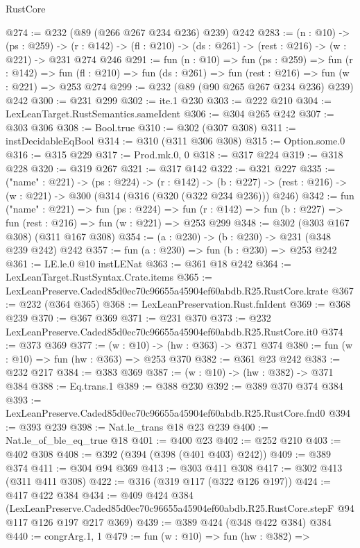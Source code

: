 \begin{lexlean}{RustCore}
\begin{coremodule}
@274 := @232 (@89 (@266 @267 @234 @236) @239) @242
@283 := (n : @10) ->
  (ps : @259) ->
  (r : @142) -> (fl : @210) -> (ds : @261) -> (rest : @216) -> (w : @221) -> @231 @274 @246
@291 := fun (n : @10) =>
  fun (ps : @259) =>
  fun (r : @142) =>
  fun (fl : @210) => fun (ds : @261) => fun (rest : @216) => fun (w : @221) => @253 @274
@299 := @232 (@89 (@90 @265 @267 @234 @236) @239) @242
@300 := @231 @299
@302 := ite.{1} @230
@303 := @222 @210
@304 := LexLeanTarget.RustSemantics.sameIdent
@306 := @304 @265 @242
@307 := @303 @306
@308 := Bool.true
@310 := @302 (@307 @308)
@311 := instDecidableEqBool
@314 := @310 (@311 @306 @308)
@315 := Option.some.{0}
@316 := @315 @229
@317 := Prod.mk.{0, 0}
@318 := @317 @224
@319 := @318 @228
@320 := @319 @267
@321 := @317 @142
@322 := @321 @227
@335 := ("name" : @221) ->
  (ps : @224) ->
  (r : @142) ->
  (b : @227) -> (rest : @216) -> (w : @221) -> @300 (@314 (@316 (@320 (@322 @234 @236))) @246)
@342 := fun ("name" : @221) =>
  fun (ps : @224) =>
  fun (r : @142) => fun (b : @227) => fun (rest : @216) => fun (w : @221) => @253 @299
@348 := @302 (@303 @167 @308) (@311 @167 @308)
@354 := (a : @230) -> (b : @230) -> @231 (@348 @239 @242) @242
@357 := fun (a : @230) => fun (b : @230) => @253 @242
@361 := LE.le.{0} @10 instLENat
@363 := @361 @18 @242
@364 := LexLeanTarget.RustSyntax.Crate.items
@365 := LexLeanPreserve.Caded85d0ec70c96655a45904ef60abdb.R25.RustCore.krate
@367 := @232 (@364 @365)
@368 := LexLeanPreservation.Rust.fnIdent
@369 := @368 @239
@370 := @367 @369
@371 := @231 @370
@373 := @232 LexLeanPreserve.Caded85d0ec70c96655a45904ef60abdb.R25.RustCore.it0
@374 := @373 @369
@377 := (w : @10) -> (hw : @363) -> @371 @374
@380 := fun (w : @10) => fun (hw : @363) => @253 @370
@382 := @361 @23 @242
@383 := @232 @217
@384 := @383 @369
@387 := (w : @10) -> (hw : @382) -> @371 @384
@388 := Eq.trans.{1}
@389 := @388 @230
@392 := @389 @370 @374 @384
@393 := LexLeanPreserve.Caded85d0ec70c96655a45904ef60abdb.R25.RustCore.fnd0
@394 := @393 @239
@398 := Nat.le_trans @18 @23 @239
@400 := Nat.le_of_ble_eq_true @18
@401 := @400 @23
@402 := @252 @210
@403 := @402 @308
@408 := @392 (@394 (@398 (@401 @403) @242))
@409 := @389 @374
@411 := @304 @94 @369
@413 := @303 @411 @308
@417 := @302 @413 (@311 @411 @308)
@422 := @316 (@319 @117 (@322 @126 @197))
@424 := @417 @422 @384
@434 := @409
    @424
    @384
    (LexLeanPreserve.Caded85d0ec70c96655a45904ef60abdb.R25.RustCore.stepF
      @94
      @117
      @126
      @197
      @217
      @369)
@439 := @389 @424 (@348 @422 @384) @384
@440 := congrArg.{1, 1}
@479 := fun (w : @10) =>
  fun (hw : @382) =>

\end{coremodule}
\end{lexlean}
